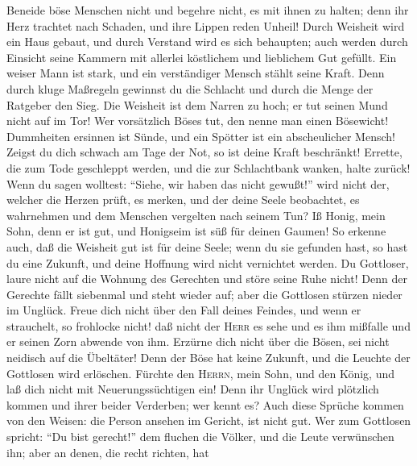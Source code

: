  Beneide böse Menschen nicht und begehre nicht, es mit
ihnen zu halten;  denn ihr Herz trachtet nach Schaden, und
ihre Lippen reden Unheil!  Durch Weisheit wird ein Haus
gebaut, und durch Verstand wird es sich behaupten;  auch
werden durch Einsicht seine Kammern mit allerlei köstlichem und
lieblichem Gut gefüllt.  Ein weiser Mann ist stark, und
ein verständiger Mensch stählt seine Kraft.  Denn durch
kluge Maßregeln gewinnst du die Schlacht und durch die Menge der
Ratgeber den Sieg.  Die Weisheit ist dem Narren zu hoch;
er tut seinen Mund nicht auf im Tor!  Wer vorsätzlich
Böses tut, den nenne man einen Bösewicht!  Dummheiten
ersinnen ist Sünde, und ein Spötter ist ein abscheulicher Mensch!
 Zeigst du dich schwach am Tage der Not, so ist deine
Kraft beschränkt!  Errette, die zum Tode geschleppt
werden, und die zur Schlachtbank wanken, halte zurück! 
Wenn du sagen wolltest: ``Siehe, wir haben das nicht gewußt!'' wird
nicht der, welcher die Herzen prüft, es merken, und der deine Seele
beobachtet, es wahrnehmen und dem Menschen vergelten nach seinem Tun?
 Iß Honig, mein Sohn, denn er ist gut, und Honigseim ist
süß für deinen Gaumen!  So erkenne auch, daß die Weisheit
gut ist für deine Seele; wenn du sie gefunden hast, so hast du eine
Zukunft, und deine Hoffnung wird nicht vernichtet werden.
 Du Gottloser, laure nicht auf die Wohnung des Gerechten
und störe seine Ruhe nicht!  Denn der Gerechte fällt
siebenmal und steht wieder auf; aber die Gottlosen stürzen nieder im
Unglück.  Freue dich nicht über den Fall deines Feindes,
und wenn er strauchelt, so frohlocke nicht!  daß nicht
der \textsc{Herr} es sehe und es ihm mißfalle und er seinen Zorn abwende
von ihm.  Erzürne dich nicht über die Bösen, sei nicht
neidisch auf die Übeltäter!  Denn der Böse hat keine
Zukunft, und die Leuchte der Gottlosen wird erlöschen. 
Fürchte den \textsc{Herrn}, mein Sohn, und den König, und laß dich nicht
mit Neuerungssüchtigen ein!  Denn ihr Unglück wird
plötzlich kommen und ihrer beider Verderben; wer kennt es?
 Auch diese Sprüche kommen von den Weisen: die Person
ansehen im Gericht, ist nicht gut.  Wer zum Gottlosen
spricht: ``Du bist gerecht!'' dem fluchen die Völker, und die Leute
verwünschen ihn;  aber an denen, die recht richten, hat
